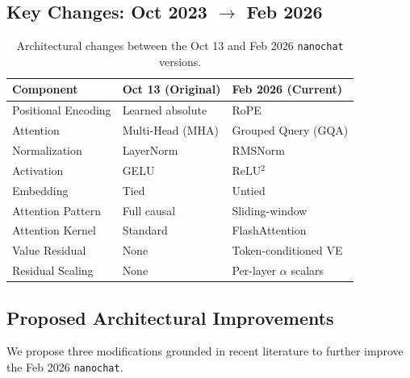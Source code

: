 \documentclass[a4paper,12pt]{article}
\begin{document}
\subsection{Key Changes: Oct 2023 $\rightarrow$ Feb 2026}

\begin{table}[H]
\centering
\small
\begin{tabular}{lll}
\toprule
\textbf{Component} & \textbf{Oct 13 (Original)} & \textbf{Feb 2026 (Current)} \\
\midrule
Positional Encoding & Learned absolute & RoPE \cite{su2024roformer} \\
Attention & Multi-Head (MHA) & Grouped Query (GQA) \cite{ainslie2023gqa} \\
Normalization & LayerNorm & RMSNorm \cite{zhang2019root} \\
Activation & GELU & ReLU$^2$ \cite{so2022primer} \\
Embedding & Tied & Untied \\
Attention Pattern & Full causal & Sliding-window \cite{beltagy2020longformer} \\
Attention Kernel & Standard & FlashAttention \cite{dao2023flashattention2} \\
Value Residual & None & Token-conditioned VE \\
Residual Scaling & None & Per-layer $\alpha$ scalars \\
\bottomrule
\end{tabular}
\caption{Architectural changes between the Oct 13 and Feb 2026 \texttt{nanochat} versions.}
\end{table}

\subsection{Proposed Architectural Improvements}

We propose three modifications grounded in recent literature to further improve the Feb 2026 \texttt{nanochat}.
\end{document}
